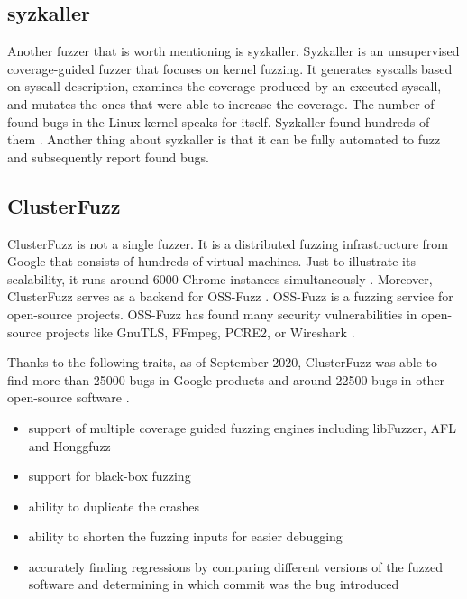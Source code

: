 \subsection{syzkaller}
Another fuzzer that is worth mentioning is syzkaller. Syzkaller is an unsupervised coverage-guided fuzzer that focuses on kernel fuzzing. It generates syscalls based on syscall description, examines the coverage produced by an executed syscall, and mutates the ones that were able to increase the coverage. The number of found bugs in the Linux kernel speaks for itself. Syzkaller found hundreds of them \cite{syzkaller2020bugs}. Another thing about syzkaller is that it can be fully automated to fuzz and subsequently report found bugs.


\subsection{ClusterFuzz}
ClusterFuzz is not a single fuzzer. It is a distributed fuzzing infrastructure from Google that consists of hundreds of virtual machines. Just to illustrate its scalability, it runs around 6000 Chrome instances simultaneously \cite{xu2017designing}. Moreover, ClusterFuzz serves as a backend for OSS-Fuzz \cite{ossfuzz2020readme}. OSS-Fuzz is a fuzzing service for open-source projects. OSS-Fuzz has found many security vulnerabilities in open-source projects like GnuTLS, FFmpeg, PCRE2, or Wireshark \cite{chang2017oss}.

Thanks to the following traits, as of September 2020, ClusterFuzz was able to find more than 25000 bugs in Google products and around 22500 bugs in other open-source software \cite{clusterfuzz2020readme}.

\begin{itemize}
    \item support of multiple coverage guided fuzzing engines including libFuzzer, AFL and Honggfuzz
    \item support for black-box fuzzing
    \item ability to duplicate the crashes
    \item ability to shorten the fuzzing inputs for easier debugging
    \item accurately finding regressions by comparing different versions of the fuzzed software and determining in which commit was the bug introduced
\end{itemize}
